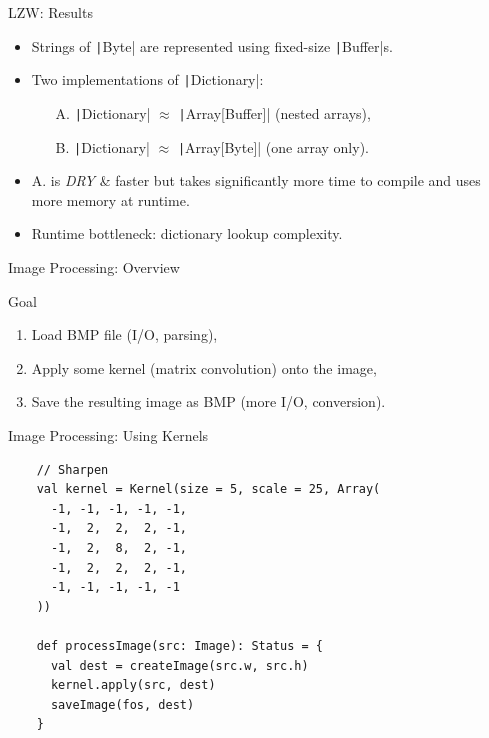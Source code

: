 \documentclass[xcolor={usenames,dvipsnames}]{beamer}
\newcommand{\InlineS}[1]{\texttt|#1|}
\begin{document}
\begin{frame}{LZW: Results}

  \begin{itemize}
    \item Strings of \InlineS{Byte} are represented using fixed-size \InlineS{Buffer}s.
    \item Two implementations of \InlineS{Dictionary}:
      \begin{enumerate}
        \item[A.] \InlineS{Dictionary} $\approx$ \InlineS{Array[Buffer]} (nested arrays),
        \item[B.] \InlineS{Dictionary} $\approx$ \InlineS{Array[Byte]}\;\;\;\: (one array only).
      \end{enumerate}
    \item A. is \emph{DRY} \& faster but takes significantly more time to compile and uses more memory at runtime.
    \item Runtime bottleneck: dictionary lookup complexity.
  \end{itemize}

\end{frame}

\begin{frame}{Image Processing: Overview}

  \begin{block}{Goal}
    \begin{enumerate}
      \item Load BMP file (I/O, parsing),
      \item Apply some kernel (matrix convolution) onto the image,
      \item Save the resulting image as BMP (more I/O, conversion).
    \end{enumerate}
  \end{block}

\end{frame}


\begin{frame}[fragile]{Image Processing: Using Kernels}
  \begin{verbatim}
    // Sharpen
    val kernel = Kernel(size = 5, scale = 25, Array(
      -1, -1, -1, -1, -1,
      -1,  2,  2,  2, -1,
      -1,  2,  8,  2, -1,
      -1,  2,  2,  2, -1,
      -1, -1, -1, -1, -1
    ))

    def processImage(src: Image): Status = {
      val dest = createImage(src.w, src.h)
      kernel.apply(src, dest)
      saveImage(fos, dest)
    }
  \end{verbatim}
\end{frame}
\end{document}
